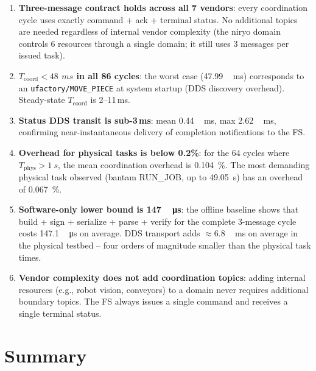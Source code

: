 \documentclass[11pt,a4paper]{article}
\newcommand{\ms}{\,\si{ms}}
\begin{document}
\begin{enumerate}
  \item \textbf{Three-message contract holds across all 7 vendors}: every
    coordination cycle uses exactly command + ack + terminal status.  No
    additional topics are needed regardless of internal vendor complexity
    (the niryo domain controls 6 resources through a single domain; it
    still uses 3 messages per issued task).
  \item \textbf{$T_{\text{coord}} < \SI{48}{\ms}$ in all 86 cycles}:
    the worst case (\SI{47.99}{\ms}) corresponds to an
    \texttt{ufactory/MOVE\_PIECE} at system startup (DDS discovery overhead).
    Steady-state $T_{\text{coord}}$ is 2--11\,ms.
  \item \textbf{Status DDS transit is sub-3\,ms}: mean
    \SI{0.44}{\ms}, max \SI{2.62}{\ms}, confirming near-instantaneous
    delivery of completion notifications to the FS.
  \item \textbf{Overhead for physical tasks is below 0.2\%}: for the 64
    cycles where $T_{\text{phys}} > \SI{1}{s}$, the mean coordination
    overhead is \SI{0.104}{\percent}.
    The most demanding physical task observed (bantam RUN\_JOB, up to
    \SI{49.05}{s}) has an overhead of \SI{0.067}{\percent}.
  \item \textbf{Software-only lower bound is \SI{147}{\,\micro s}}: the
    offline baseline shows that build + sign + serialize + parse + verify
    for the complete 3-message cycle costs \SI{147.1}{\,\micro s} on
    average.  DDS transport adds $\approx$\SI{6.8}{\ms} on average in
    the physical testbed -- four orders of magnitude smaller than the
    physical task times.
  \item \textbf{Vendor complexity does not add coordination topics}: adding
    internal resources (e.g., robot vision, conveyors) to a domain never
    requires additional boundary topics.  The FS always issues a single
    command and receives a single terminal status.
\end{enumerate}

\section{Summary}
\end{document}
